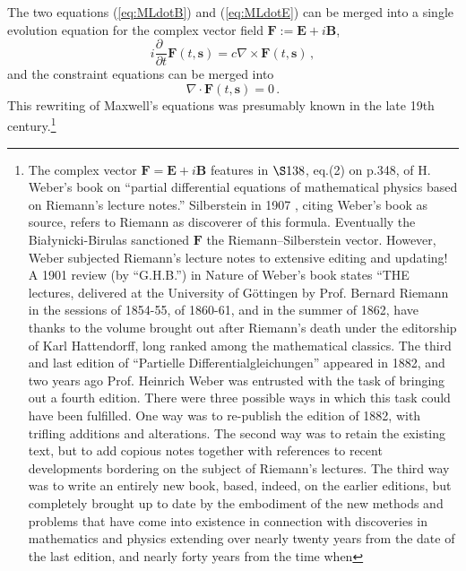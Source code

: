 \documentclass[11pt]{article}
\theoremstyle{definition}
\newcommand{\pddt}{\frac{\partial\phantom{t}}{\partial t}}
\newcommand{\vect}[1] {\boldsymbol{{ #1}} }
\newcommand{\sV}{{\vect{s}}}            %
\numberwithin{equation}{section}
\newcommand{\bB}{\mathbf{B}}
\newcommand{\bE}{\mathbf{E}}
\newcommand{\bF}{\mathbf{F}}
\newcommand{\nab}{\nabla}
\begin{document}
 The two equations (\ref{eq:MLdotB}) and (\ref{eq:MLdotE}) can be merged into a single evolution equation 
for the complex vector field $\bF := \bE +i\bB$,
\begin{equation}
\textstyle
 i \pddt{\bF(t,\sV)}
= \label{eq:MLdotF}
        c\nab\times\bF(t,\sV) \, ,
\end{equation}
and the constraint equations can be merged into
\begin{equation}
\textstyle
        \nab\cdot \bF(t,\sV)  
= \label{eq:MLdivF}
        0\, .
\end{equation}
 This rewriting of Maxwell's equations was presumably known in the late 19th century.\footnote{The complex 
   vector $\bF = \bE +i\bB$ features in ${\S138}$, eq.(2) on p.348, of H. Weber's book \cite{Weber} on ``partial differential 
   equations of mathematical physics based on Riemann's lecture notes.'' 
  Silberstein in 1907 \cite{SilberA,SilberB}, citing Weber's book as source, refers to Riemann as discoverer of this formula.
  Eventually the Bia{\l}ynicki-Birulas \cite{IBBZBBphotonREV} sanctioned $\bF$ the Riemann--Silberstein vector.
  However, Weber subjected Riemann's lecture notes to extensive editing and updating! 
  A 1901 review (by ``G.H.B.'') in Nature \cite{NatureBOOKreview} of Weber's book states 
    ``THE lectures, delivered at the University of G\"ottingen by Prof. Bernard Riemann in the sessions of 1854-55, of 
        1860-61, and in the summer of 1862, have thanks to the volume brought out after Riemann's death under the editorship 
        of Karl Hattendorff, long ranked among the mathematical classics. 
      The third and last edition of ``Partielle Differentialgleichungen'' appeared in 1882, and two years ago Prof. Heinrich 
        Weber was entrusted with the task of bringing out a fourth edition. 
      There were three possible ways in which this task could have been fulfilled. 
      One way was to re-publish the edition of 1882, with trifling additions and alterations. 
      The second way was to retain the existing text, but to add copious notes together with references to recent developments 
        bordering on the subject of Riemann’s lectures. 
      The third way was to write an entirely new book, based, indeed, on the earlier editions, but completely brought up to date 
        by the embodiment of the new methods and problems that have come into existence in connection with discoveries in mathematics 
        and physics extending over nearly twenty years from the date of the last edition, and nearly forty years from the time when 
}
\end{document}
